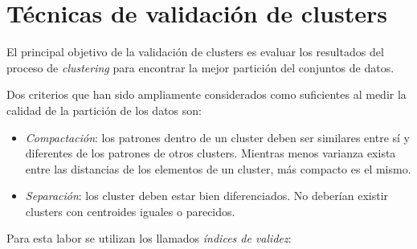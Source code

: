 \section{Técnicas de validación de clusters} 
\label{sect:tval}
El principal objetivo de la validación de clusters es evaluar los resultados
del proceso de \emph{clustering} para encontrar la mejor partición del conjuntos
de datos.

Dos criterios que han sido ampliamente considerados como suficientes al
medir la calidad de la partición de los datos son\cite{PSO_0}:
\begin{itemize}
    \item \emph{Compactación}: los patrones dentro de un cluster deben ser
similares entre sí y diferentes de los patrones de otros clusters. Mientras
menos varianza exista entre las distancias de los elementos de un cluster, más
compacto es el mismo.
    \item \emph{Separación}: los cluster deben estar bien diferenciados. No
deberían existir clusters con centroides iguales o parecidos.
\end{itemize}

Para esta labor se utilizan los llamados \emph{índices de validez}:

